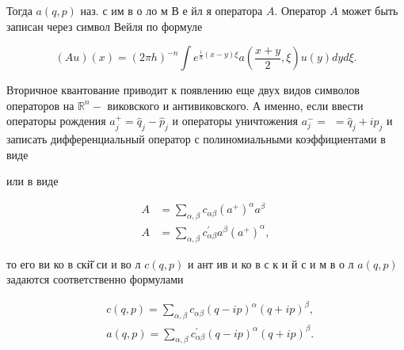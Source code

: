 \documentclass[10pt]{article}
\begin{document}
Тогда $a(q, p)$ наз. с им в о ло м В е йл я оператора $A$. Оператор $A$ может быть записан через символ Вейля по формуле



\[

(A u)(x)=(2 \pi h)^{-n} \int e^{\frac{i}{h}(x-y) \xi} a\left(\frac{x+y}{2}, \xi\right) u(y) d y d \xi .

\]



Вторичное квантование приводит к появлению еще двух видов символов операторов на $\mathbb{R}^{n}-$ виковского и антивиковского. А именно, если ввести операторы рождения $a_{j}^{+}=\hat{q}_{j}-\hat{p}_{j}$ и операторы уничтожения $a_{j}^{-}=$ $=\hat{q}_{j}+i \hat{p}_{j}$ и записать дифференциальный оператор с полиномиальными коэффициентами в виде



или в виде



\[

\begin{aligned}

A & =\sum_{\alpha, \beta} c_{\alpha \beta}\left(a^{+}\right)^{\alpha} a^{\beta} \\

A & =\sum_{\alpha, \beta} c_{\alpha \beta}^{\prime} a^{\beta}\left(a^{+}\right)^{\alpha},

\end{aligned}

\]



то его ви ко в скй̆ си и во л $c(q, p)$ и ант ив и ко в с к и й с и м в о л $a(q, p)$ задаются соответственно формулами



\[

\begin{aligned}

& c(q, p)=\sum_{\alpha, \beta} c_{\alpha \beta}(q-i p)^{\alpha}(q+i p)^{\beta}, \\

& a(q, p)=\sum_{\alpha, \beta} c_{\alpha \beta}^{\prime}(q-i p)^{\alpha}(q+i p)^{\beta} .

\end{aligned}

\]
\end{document}
